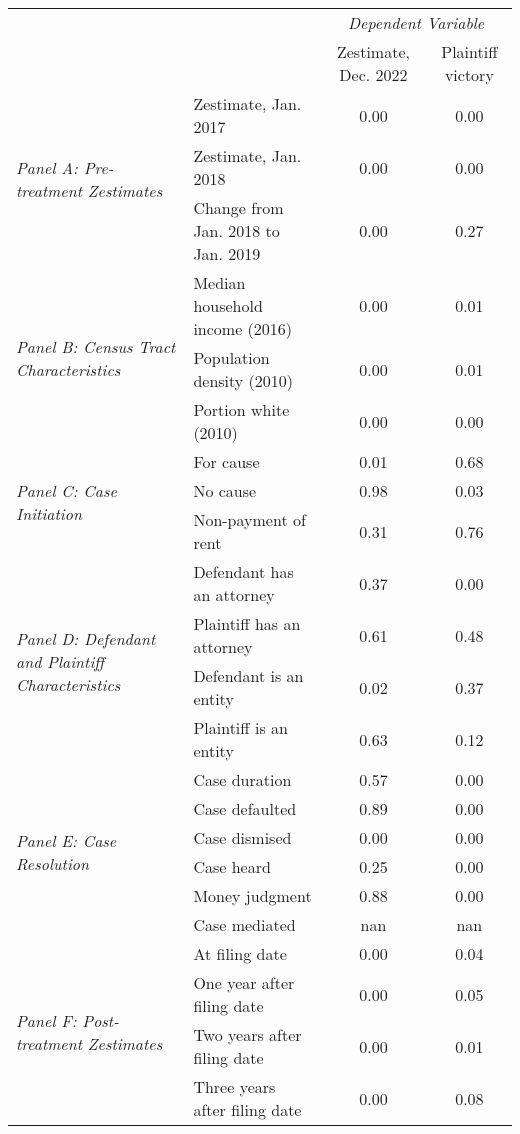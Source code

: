 \begin{tabular}{llcc}
\toprule
 &  & \multicolumn{2}{c}{\textit{Dependent Variable}} \\
 &  & Zestimate, Dec. 2022 & Plaintiff victory \\
\midrule
\multirow[c]{3}{3cm}{\textit{Panel A: Pre-treatment Zestimates}} & Zestimate, Jan. 2017 & 0.00 & 0.00 \\
 & Zestimate, Jan. 2018 & 0.00 & 0.00 \\
 & Change from Jan. 2018 to Jan. 2019 & 0.00 & 0.27 \\
\cline{1-4}
\multirow[c]{3}{3cm}{\textit{Panel B: Census Tract Characteristics}} & Median household income (2016) & 0.00 & 0.01 \\
 & Population density (2010) & 0.00 & 0.01 \\
 & Portion white (2010) & 0.00 & 0.00 \\
\cline{1-4}
\multirow[c]{3}{3cm}{\textit{Panel C: Case Initiation}} & For cause & 0.01 & 0.68 \\
 & No cause & 0.98 & 0.03 \\
 & Non-payment of rent & 0.31 & 0.76 \\
\cline{1-4}
\multirow[c]{4}{3cm}{\textit{Panel D: Defendant and Plaintiff Characteristics}} & Defendant has an attorney & 0.37 & 0.00 \\
 & Plaintiff has an attorney & 0.61 & 0.48 \\
 & Defendant is an entity & 0.02 & 0.37 \\
 & Plaintiff is an entity & 0.63 & 0.12 \\
\cline{1-4}
\multirow[c]{6}{3cm}{\textit{Panel E: Case Resolution}} & Case duration & 0.57 & 0.00 \\
 & Case defaulted & 0.89 & 0.00 \\
 & Case dismised & 0.00 & 0.00 \\
 & Case heard & 0.25 & 0.00 \\
 & Money judgment & 0.88 & 0.00 \\
 & Case mediated & nan & nan \\
\cline{1-4}
\multirow[c]{4}{3cm}{\textit{Panel F: Post-treatment Zestimates}} & At filing date & 0.00 & 0.04 \\
 & One year after filing date & 0.00 & 0.05 \\
 & Two years after filing date & 0.00 & 0.01 \\
 & Three years after filing date & 0.00 & 0.08 \\
\cline{1-4}
\bottomrule
\end{tabular}
